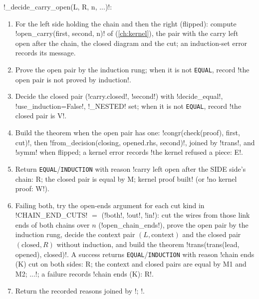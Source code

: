 \begin{algorithm}\label{alg:proofs-carry-open}
\py!_decide_carry_open(L, R, n, ...)!:
\begin{enumerate}
\item For the left side holding the chain and then the right (flipped): compute \py!open_carry(first, second, n)! of  (\cref{ch:kernel}), the pair with the carry left open after the chain, the closed diagram and the cut; an induction-set error records its message.
\item Prove the open pair by the induction rung; when it is not \texttt{EQUAL}, record \code!the open pair is not proved by induction!.
\item Decide the closed pair (\py!carry.closed!, \py!second!) with \py!decide_equal!, \py!use_induction=False!, \py!_NESTED! set; when it is not \texttt{EQUAL}, record \code!the closed pair is V!.
\item Build the theorem when the open pair has one: \py!congr(check(proof), first, cut)!, then \py!from_decision(closing, opened.rhs, second)!, joined by \py!trans!, and \py!symm! when flipped; a kernel error records \code!the kernel refused a piece: E!.
\item Return \texttt{EQUAL}/\allowbreak\texttt{INDUCTION} with reason \code!carry left open after the SIDE side's chain: R; the closed pair is equal by M; kernel proof built! (or \code!no kernel proof: W!).
\item Failing both, try the open-ends argument for each cut kind in \py!CHAIN_END_CUTS! $=$ (\code!both!, \code!out!, \code!in!): cut the wires from those link ends of both chains over $n$ (\py!open_chain_ends!), prove the open pair by the induction rung, decide the context pair $(L,\text{context})$ and the closed pair $(\text{closed},R)$ without induction, and build the theorem \py!trans(trans(lead, opened), closed)!. A success returns \texttt{EQUAL}/\allowbreak\texttt{INDUCTION} with reason \code!chain ends (K) cut on both sides: R; the context and closed pairs are equal by M1 and M2; ...!; a failure records \code!chain ends (K): R!.
\item Return the recorded reasons joined by \code!; !.
\end{enumerate}
\end{algorithm}

